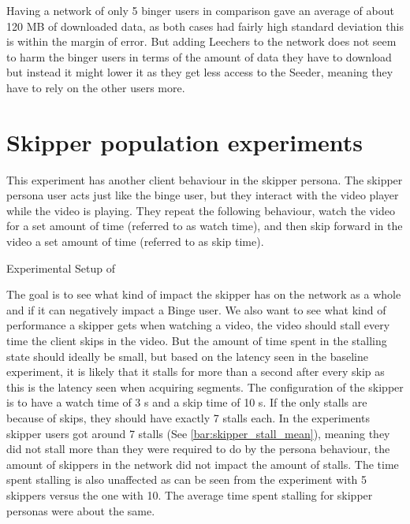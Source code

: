 Having a network of only 5 binger users in comparison gave an average of about 120 \ac{MB} of downloaded data, as both cases had fairly high standard deviation this is within the margin of error. But adding Leechers to the network does not seem to harm the binger users in terms of the amount of data they have to download but instead it might lower it as they get less access to the Seeder, meaning they have to rely on the other users more.

\FloatBarrier \section{Skipper population experiments}
\label{sec:eval_skipper}
This experiment has another client behaviour in the skipper persona.
The skipper persona user acts just like the binge user, but they interact with the video player while the video is playing. They repeat the following behaviour, watch the video for a set amount of time (referred to as watch time), and then skip forward in the video a set amount of time (referred to as skip time).

\begin{table}[!htbp]
\myfloatalign
\caption[Experimental Setup of Skipper]{Experimental Setup of }
\label{tab:exp_overview_skipper}

\end{table}


The goal is to see what kind of impact the skipper has on the network as a whole and if it can negatively impact a Binge user. We also want to see what kind of performance a skipper gets when watching a video, the video should stall every time the client skips in the video. But the amount of time spent in the stalling state should ideally be small, but based on the latency seen in the baseline experiment, it is likely that it stalls for more than a second after every skip as this is the latency seen when acquiring segments. The configuration of the skipper is to have a watch time of 3 \ac{s} and a skip time of 10 \ac{s}. If the only stalls are because of skips, they should have exactly 7 stalls each.
In the experiments skipper users got around 7 stalls (See \autoref{bar:skipper_stall_mean}), meaning they did not stall more than they were required to do by the persona behaviour, the amount of skippers in the network did not impact the amount of stalls. The time spent stalling is also unaffected as can be seen from the experiment with 5 skippers versus the one with 10. The average time spent stalling for skipper personas were about the same.

